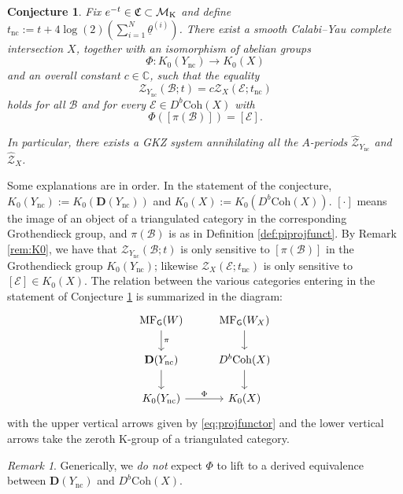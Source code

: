 \documentclass[12pt,a4paper,oneside]{amsart}
\numberwithin{equation}{section}
\newtheorem{cj}[thm]{Conjecture}
\theoremstyle{definition}
\theoremstyle{remark}
\newtheorem{rmk}[thm]{Remark}
\newcommand{\mz}{\mathcal{Z}}
\newcommand{\mM}{\mathcal{M}}
\newcommand{\mE}{\mathcal{E}}
\newcommand{\sG}{\mathsf{G}}
\newcommand{\Br}{\mathcal{B}}
\newcommand{\Ync}{Y_{\mathrm{nc}}}
\newcommand{\pz}{\widehat{\mathcal{Z}}}
\newcommand{\MF}{\mathrm{MF}}
\newcommand{\DC}{\mathbf{D}}
\newcommand{\tnc}{t_{\mathrm{nc}}}
\begin{document}
\begin{cj}\label{conj1}
    Fix $e^{-t} \in \mathfrak{C} \subset \mM_{\text{\rm K}}$ and define $\tnc := t + 4\log (2) \left( \sum_{i=1}^{N} \underline{\theta}^{(i)} \right)$.
    There exist a smooth Calabi--Yau complete intersection $X$, together with an isomorphism of abelian groups
    \begin{equation*}
        \Phi \colon K_0 \left( \Ync \right) \longrightarrow K_0 \left( X \right)
    \end{equation*}
    and an overall constant $c \in \mathbb{C}$, such that the equality 
    \begin{equation*}
        \mz_{\Ync} (\Br; t) = c \mz_{X} (\mE ; \tnc) 
    \end{equation*}
    holds for all $\Br$ and for every $\mE \in D^b \mathrm{Coh} (X)$ with 
    \begin{equation*} 
        \Phi \left( [\pi (\Br)] \right) = [\mE].
    \end{equation*}\par
    In particular, there exists a GKZ system annihilating all the $A$-periods $\pz_{\Ync}$ and $\pz_{X}$.
\end{cj}
Some explanations are in order. 
In the statement of the conjecture, $ K_0 \left( \Ync \right):= K_0 \left( \DC (\Ync) \right)$ and $K_0 \left(X \right) := K_0 \left( D^b \mathrm{Coh} (X) \right)$. $[ \cdot ]$ means the image of an object of a triangulated category in the corresponding Grothendieck group, and $\pi (\Br)$ is as in Definition \ref{def:piprojfunct}.
By Remark \ref{rem:K0}, we have that $\mz_{\Ync} (\Br; t)$ is only sensitive to $[\pi (\Br)]$ in the Grothendieck group $K_0 (\Ync)$; likewise $\mz_{X} (\mE ; \tnc)$ is only sensitive to $[\mE] \in K_0 (X)$. The relation between the various categories entering in the statement of Conjecture \ref{conj1} is summarized in the diagram:
\begin{equation*}
    \begin{tikzcd}
        \MF_{\sG} (W) \arrow[d,"\pi"] & \MF_{\sG} (W_X) \arrow[d] \\
        \DC (\Ync) \arrow[d] & D^b \mathrm{Coh} (X) \arrow[d] \\
        K_0(\Ync) \arrow[r, "\Phi"] & K_0(X)
    \end{tikzcd}
\end{equation*}
with the upper vertical arrows given by \eqref{eq:projfunctor} and the lower vertical arrows take the zeroth K-group of a triangulated category.\par
\begin{rmk}
 Generically, we \emph{do not} expect $\Phi$ to lift to a derived equivalence between $\DC (\Ync)$ and $D^b \mathrm{Coh} (X)$.
\end{rmk}
\end{document}
